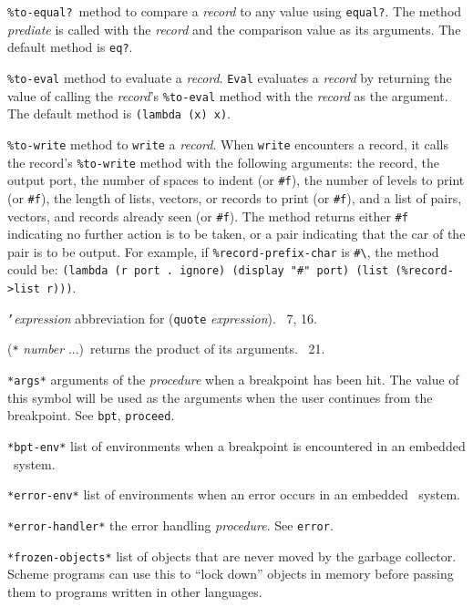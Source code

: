 \documentclass[10pt,twocolumn]{article}
\begin{document}
\texttt{\%to-equal?}\ method to compare a \emph{record} to any value
using \texttt{equal?}.  The method \emph{prediate} is called with the
\emph{record} and the comparison value as its arguments.  The default
method is \texttt{eq?}.

\texttt{\%to-eval} method to evaluate a \emph{record}.  \texttt{Eval}
evaluates a \emph{record} by returning the value of calling the
\emph{record}'s \texttt{\%to-eval} method with the \emph{record} as
the argument.  The default method is \texttt{(lambda (x) x)}.

\texttt{\%to-write} method to \texttt{write} a \emph{record}.  When
\texttt{write} encounters a record, it calls the record's
\texttt{\%to-write} method with the following arguments: the record,
the output port, the number of spaces to indent (or \texttt{\#f}), the
number of levels to print (or \texttt{\#f}), the length of lists,
vectors, or records to print (or \texttt{\#f}), and a list of pairs,
vectors, and records already seen (or \texttt{\#f}).  The method
returns either \texttt{\#f} indicating no further action is to be
taken, or a pair indicating that the car of the pair is to be output.
For example, if \texttt{\%record-prefix-char} is
\texttt{\#\textbackslash\texttildelow}, the method could be:
\texttt{(lambda (r port .\ ignore) (display "\#\texttildelow" port)
  (list (\%record->list r)))}.

\texttt{'}\emph{expression} abbreviation for (\texttt{quote}
\emph{expression}).  \RRRRRS~7, 16.

(\texttt{*} \emph{number} ...)\ returns the product of its arguments.
\RRRRRS~21.

\texttt{*args*} arguments of the \emph{procedure} when a breakpoint
has been hit.  The value of this symbol will be used as the arguments
when the user continues from the breakpoint.  See \texttt{bpt},
\texttt{proceed}.

\texttt{*bpt-env*} list of environments when a breakpoint is
encountered in an embedded \StoC\ system.

\texttt{*error-env*} list of environments when an error occurs in an
embedded \StoC\ system.

\texttt{*error-handler*} the error handling \emph{procedure}.  See
\texttt{error}.

\texttt{*frozen-objects*} list of objects that are never moved by the
garbage collector.  Scheme programs can use this to ``lock down''
objects in memory before passing them to programs written in other
languages.
\end{document}
